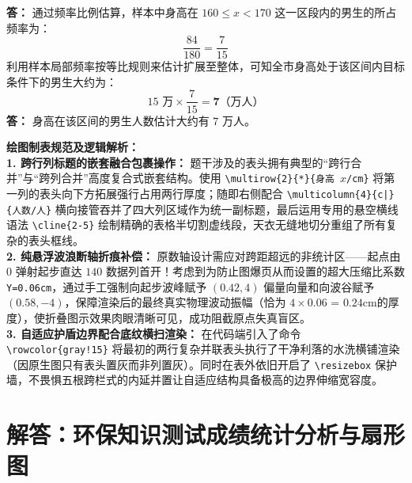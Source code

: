 \vspace{0.2cm}
\textbf{答：} 通过频率比例估算，样本中身高在 $160 \leqslant x < 170$ 这一区段内的男生的所占频率为：
$$\frac{84}{180} = \frac{7}{15}$$
利用样本局部频率按等比规则来估计扩展至整体，可知全市身高处于该区间内目标条件下的男生大约为：
$$15\text{ 万} \times \frac{7}{15} = \boldsymbol{7}\text{（万人）}$$
\textbf{答：} 身高在该区间的男生人数估计大约有 $7$ 万人。

\vspace{0.6cm}

{\small\color{blue!70!black}
\textbf{绘图制表规范及逻辑解析：}\\
\textbf{1. 跨行列标题的嵌套融合包裹操作：} 题干涉及的表头拥有典型的“跨行合并”与“跨列合并”高度复合式嵌套结构。使用 \texttt{\textbackslash multirow\{2\}\{*\}\{身高 $x$/cm\}} 将第一列的表头向下方拓展强行占用两行厚度；随即右侧配合 \texttt{\textbackslash multicolumn\{4\}\{c|\}\{人数/人\}} 横向接管吞并了四大列区域作为统一副标题，最后运用专用的悬空横线语法 \texttt{\textbackslash cline\{2-5\}} 绘制精确的表格半切割虚线段，天衣无缝地切分重组了所有复杂的表头框线。\\
\textbf{2. 纯悬浮波浪断轴折痕补偿：} 原数轴设计需应对跨距超远的非统计区——起点由 $0$ 弹射起步直达 $140$ 数据列首开！考虑到为防止图爆页从而设置的超大压缩比系数 \texttt{Y=0.06cm}，通过手工强制向起步波峰赋予 $(0.42, 4)$ 偏量向量和向波谷赋予 $(0.58, -4)$，保障渲染后的最终真实物理波动振幅（恰为 $4 \times 0.06$ = $0.24\text{cm}$的厚度），使折叠图示效果肉眼清晰可见，成功阻截原点失真盲区。\\
\textbf{3. 自适应护盾边界配合底纹横扫渲染：} 在代码端引入了命令 \texttt{\textbackslash rowcolor\{gray!15\}} 将最初的两行复杂并联表头执行了干净利落的水洗横铺渲染（因原生图只有表头置灰而非列置灰）。同时在表外依旧开启了 \texttt{\textbackslash resizebox} 保护墙，不畏惧五根跨栏式的内延并置让自适应结构具备极高的边界伸缩宽容度。
}

\newpage



\newpage

\section{解答：环保知识测试成绩统计分析与扇形图}

\vspace{0.6cm}

